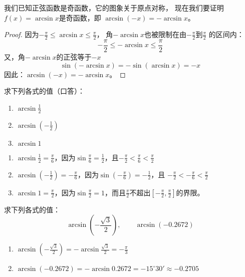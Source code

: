 我们已知正弦函数是奇函数，它的图象关于原点对称，
现在我们要证明 $f(x)=\arcsin x$是奇函数，即
$\arcsin(-x)=-\arcsin x$。

\begin{proof}
    因为$-\frac{\pi}{2}\le \arcsin x\le \frac{\pi}{2}$，
    角$-\arcsin x$也被限制在由$-\frac{\pi}{2}$到$\frac{\pi}{2}$
    的区间内：
    $$-\frac{\pi}{2}\le -\arcsin x\le \frac{\pi}{2}$$
    又，角$-\arcsin x$的正弦等于$-x$
\[\sin(-\arcsin x)=-\sin(\arcsin x)=-x\]
因此：$\arcsin(-x)=-\arcsin x$。
\end{proof}

\begin{example}
    求下列各式的值（口答）：
    \begin{enumerate}
        \item $\arcsin\frac{1}{2}$
        \item $\arcsin\left(-\frac{1}{2}\right)$
        \item $\arcsin 1$
    \end{enumerate}
\end{example}

\begin{solution}
\begin{enumerate}
    \item $\arcsin\frac{1}{2}=\frac{\pi}{6}$，因为$\sin\frac{\pi}{6}=\frac{1}{2}$，且$-\frac{\pi}{2}<\frac{\pi}{6}<\frac{\pi}{2}$

    \item $\arcsin\left(-\frac{1}{2}\right)=-\frac{\pi}{6}$，因为$\sin\left(-\frac{\pi}{6}\right)=-\frac{1}{2}$，且
    $-\frac{\pi}{2}<-\frac{\pi}{6}<\frac{\pi}{2}$
    \item $\arcsin 1=\frac{\pi}{2}$，因为$\sin\frac{\pi}{2}=1$，而且$\frac{\pi}{2}$不超出$\left[-\frac{\pi}{2},\frac{\pi}{2}\right]$的界限。
\end{enumerate}
\end{solution}

\begin{example}
    求下列各式的值：
\[\arcsin\left(-\frac{\sqrt{3}}{2}\right),\qquad \arcsin (-0.2672) \]
\end{example}

\begin{solution}
\begin{enumerate}
    \item $\arcsin\left(-\frac{\sqrt{3}}{2}\right)=-\arcsin\frac{\sqrt{3}}{2}=-\frac{\pi}{3}$
    \item $\arcsin(-0.2672)=-\arcsin0.2672=-15^{\circ}30'\approx -0.2705$
\end{enumerate}
    
\end{solution}



